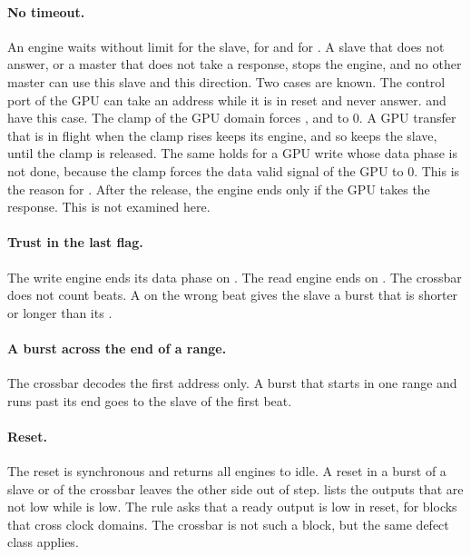 \paragraph{No timeout.} An engine waits without limit for the slave, for  and for . A slave that does not answer, or a master that does not take a response, stops the engine, and no other master can use this slave and this direction. Two cases are known. The control port of the GPU can take an address while it is in reset and never answer.  and  have this case. The clamp of the GPU domain forces ,  and  to 0. A GPU transfer that is in flight when the clamp rises keeps its engine, and so keeps the slave, until the clamp is released. The same holds for a GPU write whose data phase is not done, because the clamp forces the data valid signal of the GPU to 0. This is the reason for . After the release, the engine ends only if the GPU takes the response. This is not examined here.

\paragraph{Trust in the last flag.} The write engine ends its data phase on . The read engine ends on . The crossbar does not count beats. A  on the wrong beat gives the slave a burst that is shorter or longer than its .

\paragraph{A burst across the end of a range.} The crossbar decodes the first address only. A burst that starts in one range and runs past its end goes to the slave of the first beat.

\paragraph{Reset.} The reset is synchronous and returns all engines to idle. A reset in a burst of a slave or of the crossbar leaves the other side out of step.  lists the outputs that are not low while  is low. The rule  asks that a ready output is low in reset, for blocks that cross clock domains. The crossbar is not such a block, but the same defect class applies.

